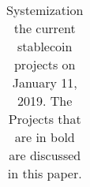 \begin{table}[h!]
\begin{tabular}{|c|c|c|c|l|}
\end{tabular}
\caption{\footnotesize{Systemization the current stablecoin projects} on January 11, 2019. The Projects that are in bold are discussed in this paper.}
\label{tab:stablecoins}
\vspace{1em}
\end{table}
